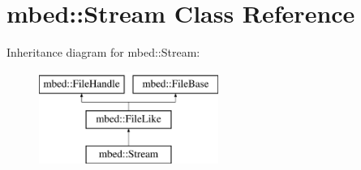 \hypertarget{classmbed_1_1Stream}{}\section{mbed\+:\+:Stream Class Reference}
\label{classmbed_1_1Stream}
Inheritance diagram for mbed\+:\+:Stream\+:\begin{figure}[H]
\begin{center}
\leavevmode
\includegraphics[height=3.000000cm]{classmbed_1_1Stream}
\end{center}
\end{figure}
